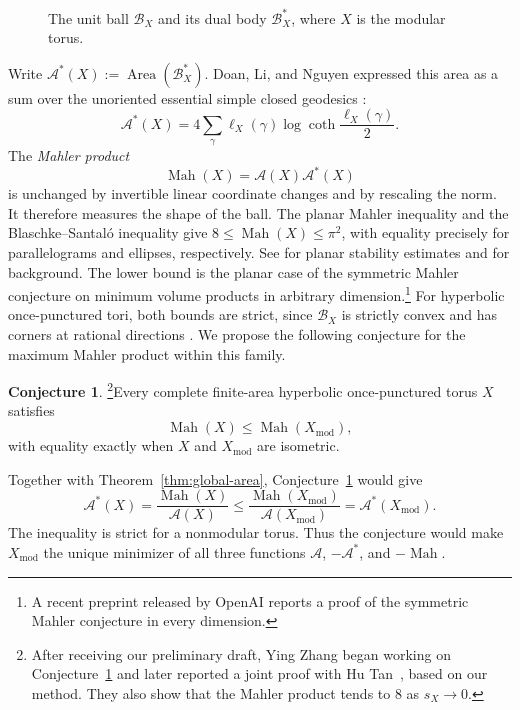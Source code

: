 \documentclass[10pt,twoside]{article}
\theoremstyle{plain}
\theoremstyle{definition}
\newtheorem{conjecture}[theorem]{Conjecture}
\theoremstyle{remark}
\DeclareMathOperator{\Area}{Area}
\newcommand{\A}{\mathcal A}
\newcommand{\B}{\mathcal B}
\newcommand{\Xmod}{X_{\mathrm{mod}}}
\begin{document}
\begin{figure}[ht]
\caption{The unit ball $\B_X$ and its dual body $\B_X^*$, where $X$ is the modular torus.}
\label{fig:dual-introduction}
\end{figure}
Write $\A^*(X):=\Area(\B_X^*)$. Doan, Li, and Nguyen expressed
this area as a sum over the unoriented essential simple closed
geodesics \cite[Theorem~1.3]{DLN}:
$$
\mathcal A^*(X)
=4\sum_\gamma\ell_X(\gamma)\log\coth\frac{\ell_X(\gamma)}2.
$$
The \emph{Mahler product}
$$
\operatorname{Mah}(X)=\A(X)\A^*(X)
$$
is unchanged by invertible linear coordinate changes and by
rescaling the norm. It therefore measures the shape of the ball.
The planar Mahler inequality \cite{Mahler,Reisner} and the
Blaschke--Santal\'o inequality \cite{MeyerPajor} give
$8\leq \operatorname{Mah}(X)\leq\pi^2$, with equality precisely for parallelograms
and ellipses, respectively. See
\cite{BoroczkyMakaiMeyerReisner,Ivaki} for planar stability
estimates and \cite{Schneider,FradeliziMeyerZvavitch} for background.
The lower bound is the planar case of the symmetric Mahler
conjecture on minimum volume products in arbitrary
dimension.\footnote{A recent preprint released by OpenAI
\cite{OpenAIMahler} reports a proof of the symmetric Mahler
conjecture in every dimension.} For hyperbolic once-punctured tori,
both bounds are strict, since
$\B_X$ is strictly convex and has corners at rational directions
\cite{McShaneRivinTori,DLN}. We propose
the following conjecture for the maximum Mahler product
within this family.

\begin{conjecture}\footnote{After receiving our preliminary draft, Ying Zhang
began working on Conjecture~\ref{conj:mahler-maximum}
and later reported a joint proof with Hu Tan~\cite{TanZhang26}, based on our
method. They also show that the Mahler
product tends to $8$ as $s_X\to0$.}\label{conj:mahler-maximum}
Every complete finite-area hyperbolic once-punctured torus $X$ satisfies
$$
\operatorname{Mah}(X)\leq \operatorname{Mah}(\Xmod),
$$
with equality exactly when $X$ and $\Xmod$ are isometric.
\end{conjecture}
Together with Theorem~\ref{thm:global-area},
Conjecture~\ref{conj:mahler-maximum} would give
$$
\A^*(X)
=\frac{\operatorname{Mah}(X)}{\A(X)}
\leq\frac{\operatorname{Mah}(\Xmod)}{\A(\Xmod)}
=\A^*(\Xmod).
$$
The inequality is strict for a nonmodular torus. Thus the conjecture
would make $\Xmod$ the unique minimizer of all three functions
$\A$, $-\A^*$, and $-\operatorname{Mah}$.
\end{document}
